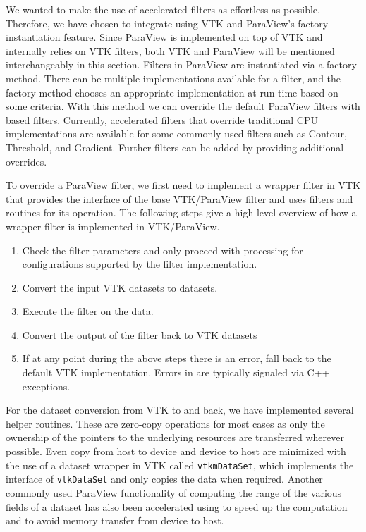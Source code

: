 We wanted to make the use of \vtkm accelerated filters as effortless as possible.
Therefore, we have chosen to integrate \vtkm using VTK and ParaView's factory-instantiation feature.
Since ParaView is implemented on top of VTK and internally relies on VTK filters, both VTK and ParaView will be mentioned interchangeably in this section.
Filters in ParaView are instantiated via a factory method.
There can be multiple implementations available for a filter, and the factory method chooses an appropriate implementation at run-time based on some criteria.
With this method we can override the default ParaView filters with \vtkm based filters.
Currently, \vtkm accelerated filters that override traditional CPU implementations are available for some commonly used filters such as Contour, Threshold, and Gradient.
Further \vtkm filters can be added by providing additional overrides.

To override a ParaView filter, we first need to implement a \vtkm wrapper filter in VTK that provides the interface of the base VTK/ParaView filter and uses \vtkm filters and routines for its operation. The following steps give a high-level overview of how a \vtkm wrapper filter is implemented in VTK/ParaView.
\begin{enumerate}
    \item Check the filter parameters and only proceed with \vtkm processing for configurations supported by the \vtkm filter implementation.
    \item Convert the input VTK datasets to \vtkm datasets. 
    \item Execute the \vtkm filter on the data.
    \item Convert the output of the \vtkm filter back to VTK datasets
    \item If at any point during the above steps there is an error, fall back to the default VTK implementation. Errors in \vtkm are typically signaled via C++ exceptions.
\end{enumerate}

For the dataset conversion from VTK to \vtkm and back, we have implemented several helper routines. These are zero-copy operations for most cases as only the ownership of the pointers to the underlying resources are transferred wherever possible. Even copy from host to device and device to host are minimized with the use of a \vtkm dataset wrapper in VTK called \texttt{vtkmDataSet}, which implements the interface of \texttt{vtkDataSet} and only copies the data when required. Another commonly used ParaView functionality of computing the range of the various fields of a dataset has also been accelerated using \vtkm to speed up the computation and to avoid memory transfer from device to host.


